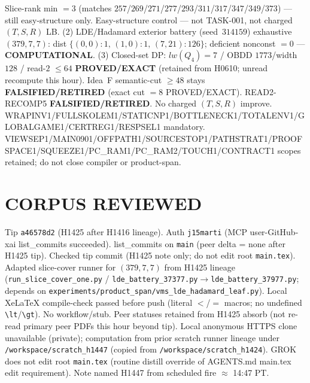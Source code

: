 \documentclass[11pt]{article}
\begin{document}
Slice-rank min $=3$ (matches $257$/$269$/$271$/$277$/$293$/$311$/$317$/$347$/$349$/$373$) --- still easy-structure only.
Easy-structure control --- not TASK-001, not charged $(T,S,R)$ LB.
(2) LDE/Hadamard exterior battery (seed~$314159$) exhaustive $(379,7,7)$:
dist $\{(0,0){:}1,\,(1,0){:}1,\,(7,21){:}126\}$; deficient nonconst $=0$ --- \textbf{COMPUTATIONAL}.
(3) Closed-set DP: $lw(Q_4)=7$ / OBDD $1773$/width $128$ / read-$2$ $\le64$
\textbf{PROVED/EXACT} (retained from H0610; unread recompute this hour).
Idea~F semantic-cut $\ge48$ stays \textbf{FALSIFIED/RETIRED} (exact cut $=8$ PROVED/EXACT).
READ2-RECOMP5 \textbf{FALSIFIED/RETIRED}. No charged $(T,S,R)$ improve.
WRAPINV1/FULLSKOLEM1/STATICNP1/BOTTLENECK1/TOTALENV1/GLOBALGAME1/CERTREG1/RESPSEL1 mandatory.
VIEWSEP1/MAIN0901/OFFPATH1/SOURCESTOP1/PATHSTRAT1/PROOFSPACE1/SQUEEZE1/PC\_RAM1/PC\_RAM2/TOUCH1/CONTRACT1 scopes retained; do not close compiler or product-span.

\section*{CORPUS REVIEWED}
Tip \texttt{a46578d2} (H1425 after H1416 lineage). Auth \texttt{j15marti} (MCP user-GitHub-xai list\_commits succeeded).
list\_commits on \texttt{main} (peer delta = none after H1425 tip).
Checked tip commit (H1425 note only; do not edit root \texttt{main.tex}).
Adapted slice-cover runner for $(379,7,7)$ from H1425 lineage
(\texttt{run\_slice\_cover\_one.py} / \texttt{lde\_battery\_37377.py}$\to$\texttt{lde\_battery\_37977.py};
depends on \texttt{experiments/product\_span/vms\_lde\_hadamard\_leaf.py}).
Local XeLaTeX compile-check passed before push (literal $<$/$=$ macros; no undefined \texttt{\textbackslash lt}/\texttt{\textbackslash gt}).
No workflow/stub. Peer statuses retained from H1425 absorb (not re-read primary peer PDFs this hour beyond tip).
Local anonymous HTTPS clone unavailable (private);
computation from prior scratch runner lineage under \texttt{/workspace/scratch\_h1447}
(copied from \texttt{/workspace/scratch\_h1424}).
GROK does not edit root \texttt{main.tex} (routine distill override of AGENTS.md main.tex edit requirement).
Note named H1447 from scheduled fire $\approx$ 14:47 PT.
\end{document}
